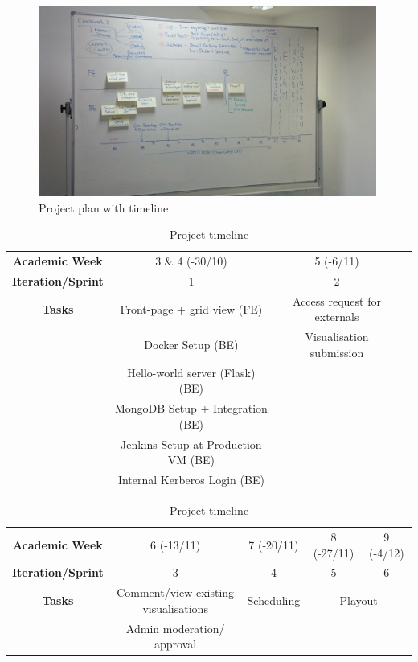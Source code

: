 \documentclass[a4paper]{article}
\begin{document}
\begin{figure}[h]
  \centering
    \includegraphics[width = 0.99\textwidth]{./planning/timeline.jpg}
   
  \caption{Project plan with timeline}
  \label{fig:timeline}
\end{figure}


\begin{table}[h]
  \begin{tabular}{c | c | c | c }
    \textbf{Academic Week} & 3 \& 4 (-30/10) & 5 (-6/11) \\
    \textbf{Iteration/Sprint} & 1 & 2 \\ \hline
    \textbf{Tasks} & Front-page + grid view (FE) & Access request for externals \\
          & Docker Setup (BE)           & Visualisation submission \\
          & Hello-world server (Flask) (BE) & \\
          & MongoDB Setup + Integration (BE) & \\
          & Jenkins Setup at Production VM (BE) & \\
          & Internal Kerberos Login (BE) & \\
  \end{tabular}

  \vspace{30pt}
  \begin{tabular}{c | c | c | c | c}
    \textbf{Academic Week} & 6 (-13/11) & 7 (-20/11) & 8 (-27/11) & 9 (-4/12) \\
    \textbf{Iteration/Sprint} & 3 & 4 & 5 & 6 \\ \hline
    \textbf{Tasks} & Comment/view existing visualisations & Scheduling & 
            \multicolumn{2}{c}{Playout} \\
          & Admin moderation/ approval &  \\
  \end{tabular}
  \caption{Project timeline}
  \label{table:timeline}
\end{table}
\end{document}
